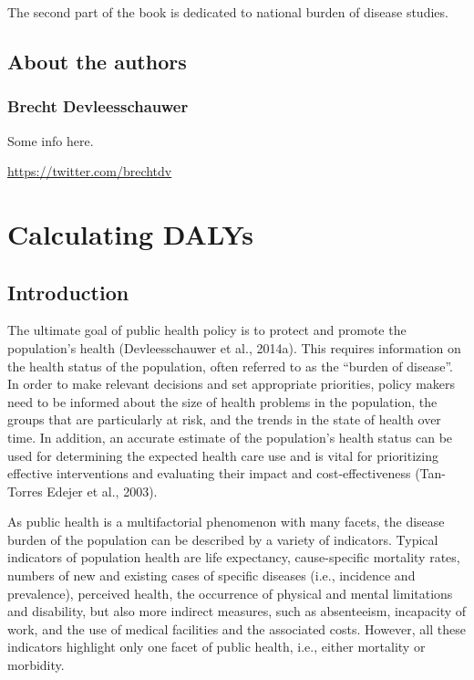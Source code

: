 \documentclass[]{book}
\begin{document}
The second part of the book is dedicated to national burden of disease
studies.

\chapter*{About the authors}\label{about-the-authors}

\section*{Brecht Devleesschauwer}\label{brecht-devleesschauwer}

Some info here.

\url{https://twitter.com/brechtdv}

\part{Calculating DALYs}\label{part-calculating-dalys}

\chapter{Introduction}\label{introduction}

The ultimate goal of public health policy is to protect and promote the
population's health (Devleesschauwer et al., 2014a). This requires
information on the health status of the population, often referred to as
the ``burden of disease''. In order to make relevant decisions and set
appropriate priorities, policy makers need to be informed about the size
of health problems in the population, the groups that are particularly
at risk, and the trends in the state of health over time. In addition,
an accurate estimate of the population's health status can be used for
determining the expected health care use and is vital for prioritizing
effective interventions and evaluating their impact and
cost-effectiveness (Tan-Torres Edejer et al., 2003).

As public health is a multifactorial phenomenon with many facets, the
disease burden of the population can be described by a variety of
indicators. Typical indicators of population health are life expectancy,
cause-specific mortality rates, numbers of new and existing cases of
specific diseases (i.e., incidence and prevalence), perceived health,
the occurrence of physical and mental limitations and disability, but
also more indirect measures, such as absenteeism, incapacity of work,
and the use of medical facilities and the associated costs. However, all
these indicators highlight only one facet of public health, i.e., either
mortality or morbidity.
\end{document}

